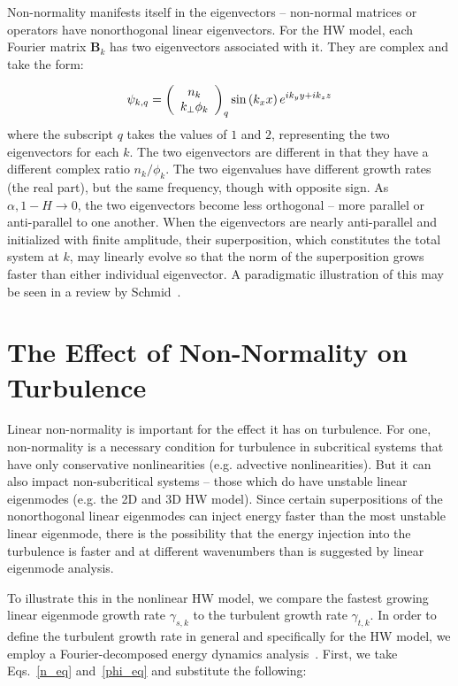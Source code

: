 \documentclass[twocolumn,showkeys,superscriptaddress]{revtex4}
\def\beq{\begin{equation}}
\def\eeq{\end{equation}}
\begin{document}
Non-normality manifests itself in the eigenvectors -- non-normal matrices or operators have nonorthogonal linear eigenvectors. For the HW model, each Fourier matrix $\mathbf{B}_k$ has two eigenvectors associated
with it. They are complex and take the form:

\beq
\label{lin_eigen_form}
\psi_{k,q} = \left( \begin{array}{cc} n_k \\ k_\perp \phi_k \end{array} \right)_q {\rm sin} \left( k_x x \right) e^{i k_y y + i k_z z} 
\eeq
where the subscript $q$ takes the values of $1$ and $2$, representing the two eigenvectors for each $k$. The two eigenvectors are different in that they have a different complex ratio $n_k/\phi_k$.
The two eigenvalues have different growth rates (the real part), but the same frequency, though with opposite sign.
As $\alpha, 1-H \to 0$, the two eigenvectors become less orthogonal -- more parallel or anti-parallel to one another. When the eigenvectors are nearly anti-parallel and initialized with finite amplitude,
their superposition, which constitutes the total system at $k$, may linearly evolve so that the norm of the superposition grows faster than either individual eigenvector. A paradigmatic illustration
of this may be seen in a review by Schmid~\cite{schmid2007}.

\section{The Effect of Non-Normality on Turbulence}
\label{sec_non_norm_turb}

Linear non-normality is important for the effect it has on turbulence. For one, non-normality is a necessary condition for turbulence in subcritical systems that have only conservative nonlinearities 
(e.g. advective nonlinearities). But it can also impact non-subcritical systems -- those which do have unstable linear eigenmodes (e.g. the 2D and 3D HW model). 
Since certain superpositions of the nonorthogonal linear eigenmodes can inject energy faster than the most unstable linear
eigenmode, there is the possibility that the energy injection into the turbulence is faster and at different wavenumbers than is suggested by linear eigenmode analysis. 

To illustrate this in the nonlinear HW model, we compare the fastest growing linear eigenmode growth rate $\gamma_{s,k}$ to the turbulent growth rate $\gamma_{t,k}$. 
In order to define the turbulent growth rate in general and specifically for the HW model, we employ a Fourier-decomposed energy dynamics analysis~\cite{camargo1995,friedman2012b,friedman2013}. 
First, we take Eqs.~\ref{n_eq} and~\ref{phi_eq} and substitute the following:
\end{document}

